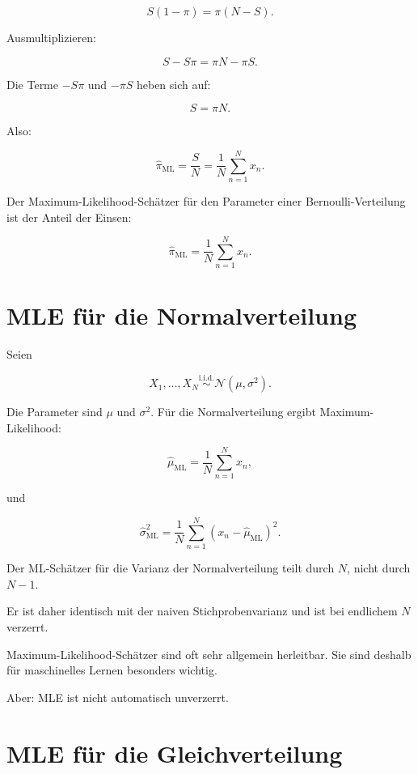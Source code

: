 \[
    S(1-\pi)
    =
    \pi(N-S).
\]

Ausmultiplizieren:

\[
    S - S\pi
    =
    \pi N - \pi S.
\]

Die Terme \(-S\pi\) und \(-\pi S\) heben sich auf:

\[
    S
    =
    \pi N.
\]

Also:

\[
    \hat{\pi}_{\mathrm{ML}}
    =
    \frac{S}{N}
    =
    \frac{1}{N}
    \sum_{n=1}^{N}
    x_n.
\]

\begin{conceptbox}
Der Maximum-Likelihood-Schätzer für den Parameter einer Bernoulli-Verteilung ist der Anteil der Einsen:

\[
    \hat{\pi}_{\mathrm{ML}}
    =
    \frac{1}{N}
    \sum_{n=1}^{N}
    x_n.
\]
\end{conceptbox}

\section{MLE für die Normalverteilung}

Seien

\[
    X_1,\dots,X_N
    \overset{\mathrm{i.i.d.}}{\sim}
    \mathcal{N}(\mu,\sigma^2).
\]

Die Parameter sind \(\mu\) und \(\sigma^2\).
Für die Normalverteilung ergibt Maximum-Likelihood:

\[
    \hat{\mu}_{\mathrm{ML}}
    =
    \frac{1}{N}
    \sum_{n=1}^{N}
    x_n,
\]

und

\[
    \hat{\sigma}^2_{\mathrm{ML}}
    =
    \frac{1}{N}
    \sum_{n=1}^{N}
    (x_n-\hat{\mu}_{\mathrm{ML}})^2.
\]

\begin{notebox}
Der ML-Schätzer für die Varianz der Normalverteilung teilt durch \(N\), nicht durch \(N-1\).

Er ist daher identisch mit der naiven Stichprobenvarianz und ist bei endlichem \(N\) verzerrt.
\end{notebox}

\begin{conceptbox}
Maximum-Likelihood-Schätzer sind oft sehr allgemein herleitbar.
Sie sind deshalb für maschinelles Lernen besonders wichtig.

Aber:
MLE ist nicht automatisch unverzerrt.
\end{conceptbox}

\section{MLE für die Gleichverteilung}

